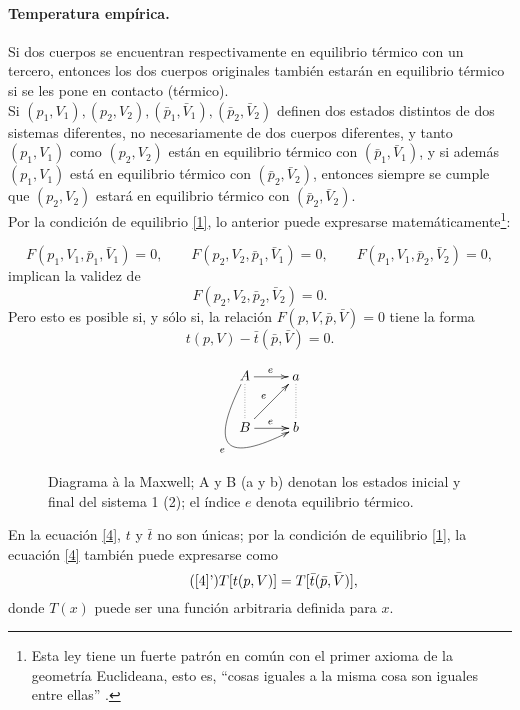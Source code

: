 \documentclass{article}
\theoremstyle{definition} \newtheorem{defi}{Definici\'on}
\theoremstyle{definition} \newtheorem{teo}{Teorema}
\theoremstyle{definition} \newtheorem{cor}{Corolario}
\begin{document}
\paragraph{Temperatura emp\'irica.}
Si dos cuerpos se encuentran respectivamente en equilibrio t\'ermico con un tercero, entonces los dos cuerpos originales tambi\'en estar\'an en equilibrio t\'ermico si se les pone en contacto (t\'ermico).\\
Si $(p_1, V_1), (p_2, V_2), (\bar{p}_1, \bar{V}_1), (\bar{p}_2, \bar{V}_2)$ definen dos estados distintos de dos sistemas diferentes, no necesariamente de dos cuerpos diferentes, y tanto $(p_1, V_1)$ como $(p_2, V_2)$ est\'an en equilibrio t\'ermico con $(\bar{p}_1, \bar{V}_1)$, y si adem\'as $(p_1, V_1)$ est\'a en equilibrio t\'ermico con $(\bar{p}_2, \bar{V}_2)$, entonces siempre se cumple que $(p_2, V_2)$ estar\'a en equilibrio t\'ermico con $(\bar{p}_2, \bar{V}_2)$.\\ Por la condici\'on de equilibrio \eqref{1}, lo anterior puede expresarse matem\'aticamente\footnote{Esta ley tiene un fuerte patr\'on en com\'un con el primer axioma de la geometr\'ia Euclideana, esto es, ``cosas iguales a la misma cosa son iguales entre ellas'' \cite{LP}.}:

\begin{equation}
F(p_1, V_1, \bar{p}_1, \bar{V}_1)=0, \qquad F(p_2, V_2, \bar{p}_1, \bar{V}_1)=0, \qquad F(p_1, V_1, \bar{p}_2, \bar{V}_2)=0,
\end{equation}
implican la validez de
\begin{equation}
F(p_2, V_2, \bar{p}_2, \bar{V}_2)=0.
\end{equation}
Pero esto es posible si, y s\'olo si, la relaci\'on $F(p, V, \bar{p}, \bar{V})=0$ tiene la forma
\begin{equation}\label{4}
t(p,V)-\bar{t}(\bar{p},\bar{V})=0.
\end{equation}
\begin{figure}[!ht]
\begin{displaymath}
\centering
\xymatrix
{
A \ar@/_3.5pc/[dr]_e \ar[r]^e \ar@{.}[d] & a \ar@{.}[d] \\
B \ar[ur]^e \ar[r]^e & b \\
}
\end{displaymath}
\caption{Diagrama \`a la Maxwell; A y B (a y b) denotan los estados inicial y final del sistema 1 (2); el \'indice $e$ denota equilibrio t\'ermico.}
\end{figure}
En la ecuaci\'on \eqref{4}, $t$ y $\bar{t}$ no son \'unicas; por la condici\'on de equilibrio \eqref{1}, la ecuaci\'on \eqref{4} tambi\'en puede expresarse como
\begin{equation}\tag{\eqref{4}'}
T[t(p,V)]=T[\bar{t}(\bar{p},\bar{V})],
\end{equation}
donde $T(x)$ puede ser una funci\'on arbitraria definida para $x$.
\end{document}
